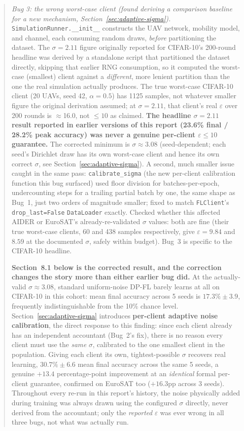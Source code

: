 \documentclass[12pt,a4paper]{article}
\begin{document}
\begin{quote}
\emph{Bug 3: the wrong worst-case client (found deriving a comparison
baseline for a new mechanism, Section~\ref{sec:adaptive-sigma}).}
\texttt{SimulationRunner.\_\_init\_\_} constructs the UAV network,
mobility model, and channel, each consuming random draws, \emph{before}
partitioning the dataset. The $\sigma=2.11$ figure originally reported
for CIFAR-10's 200-round headline was derived by a standalone script that
partitioned the dataset directly, skipping that earlier RNG consumption,
so it computed the worst-case (smallest) client against a \emph{different},
more lenient partition than the one the real simulation actually
produces. The true worst-case CIFAR-10 client (20 UAVs, seed 42,
$\alpha=0.5$) has 1125 samples, not whatever smaller figure the original
derivation assumed; at $\sigma=2.11$, that client's real $\varepsilon$ over
200 rounds is $\approx$16.0, not $\le10$ as claimed. \textbf{The headline
$\sigma=2.11$ result reported in earlier versions of this report
(23.6\% final / 28.2\% peak accuracy) was never a genuine per-client
$\varepsilon\le10$ guarantee.} The corrected minimum is $\sigma\approx3.08$
(seed-dependent; each seed's Dirichlet draw has its own worst-case client
and hence its own correct $\sigma$, see Section~\ref{sec:adaptive-sigma}).
A second, much smaller issue caught in the same pass: \texttt{calibrate\_sigma}
(the new per-client calibration function this bug surfaced) used floor
division for batches-per-epoch, undercounting steps for a trailing partial
batch by one, the same shape as Bug~1, just two orders of magnitude
smaller; fixed to match \texttt{FLClient}'s \texttt{drop\_last=False}
\texttt{DataLoader} exactly. Checked whether this affected AIDER or
EuroSAT's already-re-validated $\sigma$ values: both are fine (their true
worst-case clients, 60 and 438 samples respectively, give $\varepsilon=9.84$
and $8.59$ at the documented $\sigma$, safely within budget). Bug~3 is
specific to the CIFAR-10 headline.

\textbf{Section~8.1 below is the corrected result, and the correction
changes the story more than either earlier bug did.} At the actually-valid
$\sigma\approx3.08$, standard uniform-noise DP-FL barely learns at all on
CIFAR-10 in this cohort: mean final accuracy across 5 seeds is
$17.3\%\pm3.9$, frequently indistinguishable from the 10\% chance level.
Section~\ref{sec:adaptive-sigma} introduces \textbf{per-client adaptive
noise calibration}, the direct response to this finding: since each
client already has an independent accountant (Bug~2's fix), there is no
reason every client must use the \emph{same} $\sigma$, calibrated to the
one smallest client in the population. Giving each client its own,
tightest-possible $\sigma$ recovers real learning, $30.7\%\pm6.6$ mean
final accuracy across the same 5 seeds, a genuine $+13.4$ percentage-point
improvement at an \emph{identical} formal per-client guarantee, confirmed
on EuroSAT too ($+16.3$pp across 3 seeds). Throughout every re-run in this
report's history, the noise physically added during training was always
drawn using the configured $\sigma$ directly, never derived from the
accountant; only the \emph{reported} $\varepsilon$ was ever wrong in all
three bugs, not what was actually run.
\end{quote}
\end{document}
